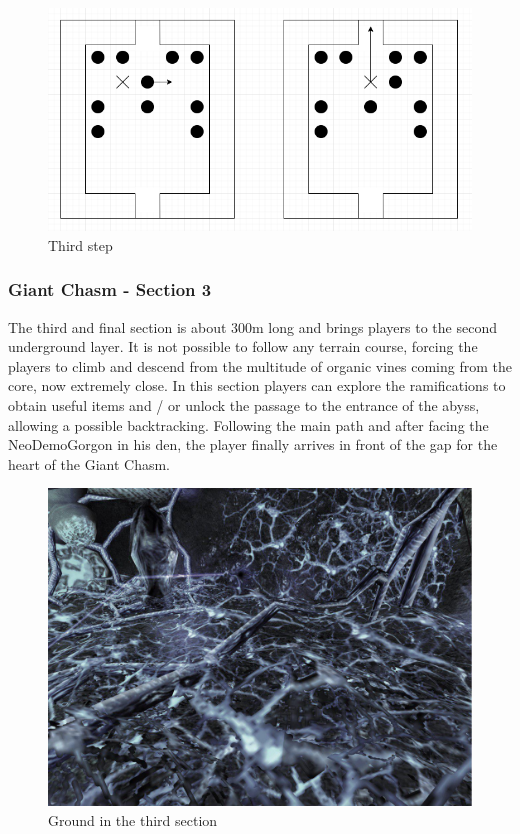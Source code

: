 \begin{figure}[H]
	\centering
	\includegraphics[width=0.8\linewidth]{images/puzzle/puzzle_024.png}
	\caption*{Third step}
\end{figure}
\newpage

\subsubsection{Giant Chasm - Section 3}
The third and final section is about 300m long and brings players to the second underground layer. It is not possible to follow any terrain course, forcing the players to climb and descend from the multitude of organic vines coming from the core, now extremely close. In this section players can explore the ramifications to obtain useful items and / or unlock the passage to the entrance of the abyss, allowing a possible backtracking. Following the main path and after facing the NeoDemoGorgon in his den, the player finally arrives in front of the gap for the heart of the Giant Chasm.

\vspace*{0.3cm}
\begin{figure}[H]
	\centering
	\includegraphics[width=0.8\linewidth]{images/visual_ref/15_giant_chasm/chasm_section_3.jpg}
	\caption*{Ground in the third section}
\end{figure}

